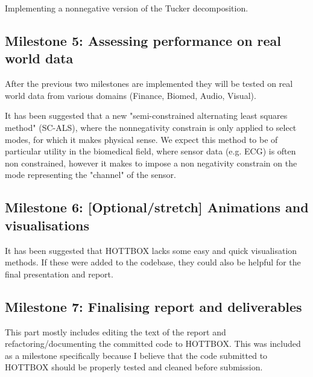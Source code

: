 \documentclass{article}
\begin{document}
Implementing a nonnegative version of the Tucker decomposition. 

\subsection{Milestone 5: Assessing performance on real world data}

After the previous two milestones are implemented they will be tested on real world data from various domains (Finance, Biomed, Audio, Visual). 

It has been suggested that a new "semi-constrained alternating least squares method" (SC-ALS), where the nonnegativity constrain is only applied to select modes, for which it makes physical sense. We expect this method to be of particular utility in the biomedical field, where sensor data (e.g. ECG) is often non constrained, however it makes to impose a non negativity constrain on the mode representing the "channel" of the sensor. 

\subsection{Milestone 6:  [Optional/stretch] Animations and visualisations}

It has been suggested that HOTTBOX lacks some easy and quick visualisation methods. If these were added to the codebase, they could also be helpful for the final presentation and report.

\subsection{Milestone 7:  Finalising report and deliverables}

This part mostly includes editing the text of the report and refactoring/documenting the committed code to HOTTBOX. This was included as a milestone specifically because I believe that the code submitted to HOTTBOX should be properly tested and cleaned before submission.
\end{document}
